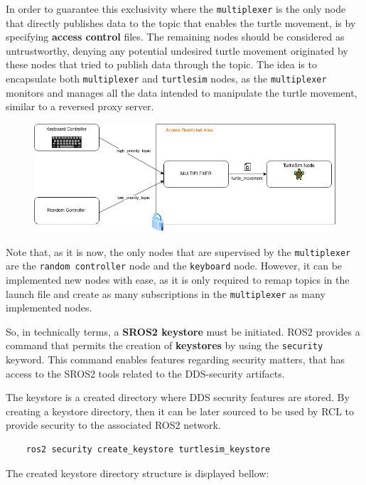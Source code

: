 In order to guarantee this exclusivity where the \texttt{multiplexer} is the only node that directly publishes data to the topic that enables the turtle movement, is by specifying \textbf{access control} files. The remaining nodes should be considered as untrustworthy, denying any potential undesired turtle movement originated by these nodes that tried to publish data through the topic. The idea is to encapsulate both \texttt{multiplexer} and \texttt{turtlesim} nodes, as the \texttt{multiplexer} monitors and manages all the data intended to manipulate the turtle movement, similar to a reversed proxy server.

\begin{figure}[H]
    \centering
    \includegraphics[width=0.8\linewidth]{images/ts_secured_multiplexer.png}
\end{figure}

Note that, as it is now, the only nodes that are supervised by the \texttt{multiplexer} are the \texttt{random controller} node and the \texttt{keyboard} node. However, it can be implemented new nodes with ease, as it is only required to remap topics in the launch file and create as many subscriptions in the \texttt{multiplexer} as many implemented nodes.

So, in technically terms, a \textbf{SROS2 keystore} must be initiated. ROS2 provides a command that permits the creation of \textbf{keystores} by using the \texttt{security} keyword. This command enables features regarding security matters, that has access to the SROS2 tools related to the DDS-security artifacts.

The keystore is a created directory where DDS security features are stored. By creating a keystore directory, then it can be later sourced to be used by RCL to provide security to the associated ROS2 network.
            
\begin{verbatim}
    ros2 security create_keystore turtlesim_keystore
\end{verbatim}

The created keystore directory structure is displayed bellow:

